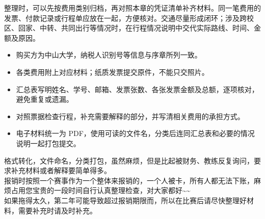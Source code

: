 整理时，可以先按费用类别归档，再对照本章的凭证清单补齐材料。同一笔费用的发票、付款记录或行程单应放在一起，方便核对。交通尽量形成闭环；涉及跨校区、回家、中转、共同出行等情况时，在行程情况说明中交代实际路线、时间、金额及原因。

\begin{SummaryBox}
\begin{itemize}[leftmargin=2\ccwd,labelsep=.6\ccwd,itemsep=6pt,topsep=4pt]
  \item {}购买方为中山大学，纳税人识别号等信息与序章所列一致。
  \item {}各类费用附上对应材料；纸质发票提交原件，不能只交照片。
  \item {}汇总表写明姓名、学号、邮箱、发票张数、各张发票金额及总额，逐项核对，避免重复或遗漏。
  \item {}对照票据检查行程，补充需要解释的部分，并写清相关费用的承担方式。
  \item {}电子材料统一为 PDF，使用可读的文件名，分类后连同汇总表和必要的情况说明一起打包提交。
\end{itemize}
\end{SummaryBox}

\begin{SideNote}
  格式转化，文件命名，分类打包，虽然麻烦，但是比起被财务、教练反复询问，要求补充材料或者解释要简单得多。\\
  报销时按照一个赛事作为一个整体来报销的，一个人被卡，所有人都无法下账，麻烦占用您宝贵的一段时间自行认真整理检查，对大家都好\textasciitilde{}\textasciitilde{}\\
  如果拖得太久，第二年可能导致超过报销期限而，所以在比赛后请尽快整理好材料，需要补充时请及时补充。
\end{SideNote}
